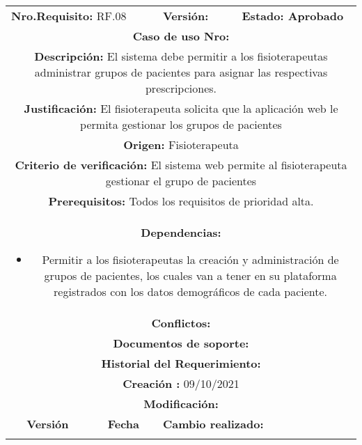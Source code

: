 \begin{center}
\begin{tabular}{|c|c|p{4cm}|p{4cm}|}
            \hline
            \rowcolor{red} \multicolumn{4}{|c|}{\textbf{Prioridad:} Alta}  \\
            \hline
            \multicolumn{2}{|l}{\textbf{Nro.Requisito: }RF.08} & \multicolumn{1}{|l}{\textbf{Versión: }} & \multicolumn{1}{|l|}{\textbf{Estado: Aprobado}} \\
            \multicolumn{4}{|p{13cm}|}{\textbf{Caso de uso Nro: }}  \\
            \hline
            \multicolumn{4}{|p{13cm}|}{\textbf{Descripción: } El sistema debe permitir a los fisioterapeutas administrar grupos de pacientes para asignar las respectivas prescripciones. } \\
            \multicolumn{4}{|p{13cm}|}{\textbf{Justificación: } El fisioterapeuta solicita que la aplicación web le permita gestionar los grupos de pacientes} \\ 
            \multicolumn{4}{|p{13cm}|}{\textbf{Origen: }Fisioterapeuta}  \\
            \multicolumn{4}{|p{13cm}|}{\textbf{Criterio de verificación: } El sistema web permite al fisioterapeuta gestionar el grupo de pacientes} \\
            \hline
            \multicolumn{4}{|p{13cm}|}{\textbf{Prerequisitos: } Todos los requisitos de prioridad alta. }\\
            \hline \multicolumn{4}{|p{12cm}|}{\textbf{Dependencias: }
               \begin{itemize}
                   \item Permitir a los fisioterapeutas la creación y administración de grupos de pacientes, los cuales van a tener en su plataforma registrados con los datos demográficos de cada paciente.
               \end{itemize}
              }  \\
            \multicolumn{4}{|p{12cm}|}{\textbf{Conflictos: }}  \\
            \hline
            \multicolumn{4}{|p{12cm}|}{\textbf{Documentos de soporte: }}  \\
            \hline
            \multicolumn{4}{|p{12cm}|}{\textbf{Historial del Requerimiento: }}  \\
            \multicolumn{4}{|p{12cm}|}{\textbf{Creación : }09/10/2021}  \\
            \multicolumn{4}{|p{12cm}|}{\textbf{Modificación: }}  \\
             \textbf{Versión} & \textbf{Fecha} & \multicolumn{2}{p{8cm}|}{\textbf{Cambio realizado:}} \\
            \hline
                 & &   \multicolumn{2}{p{8cm}|}{}
              \\
            \hline
\end{tabular}




\end{center}
